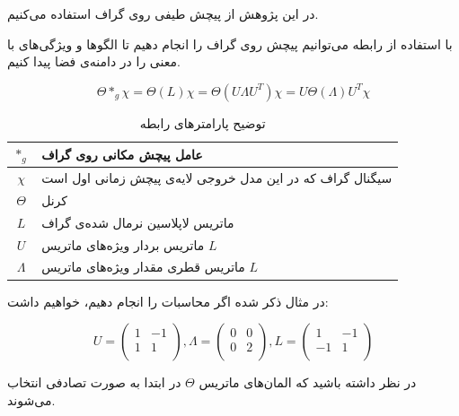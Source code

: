 در این پژوهش از پیچش طیفی روی گراف‌ استفاده می‌کنیم. 

با استفاده از رابطه  می‌توانیم پیچش روی گراف را انجام دهیم تا الگوها و ویژگی‌های با معنی را در دامنه‌ی فضا پیدا کنیم.

\begin{equation}
  \Theta *_{g} \chi = \Theta(L)\chi = \Theta(U \Lambda U^{T})\chi = U\Theta(\Lambda)U^{T}\chi
  \label{eq:convolution}
\end{equation}

\begin{table}[h]
  \centering
  \caption{توضیح پارامترهای رابطه }
  \begin{tabular}{|c|p{}|}
    \hline
    $*_{g}$ & عامل پیچش مکانی روی گراف \\
    \hline
    $\chi$ & سیگنال گراف که در این مدل خروجی لایه‌ی پیچش زمانی اول است \\
    \hline
    $\Theta$ & کرنل \\
    \hline
    $L$ & ماتریس لاپلاسین نرمال شده‌ی گراف \\
    \hline
    $U$ & ماتریس بردار ویژه‌های ماتریس $L$ \\
    \hline
    $\Lambda$ & ماتریس قطری مقدار ویژه‌های ماتریس $L$ \\
    \hline
  \end{tabular}
  \label{tbl:distance}
\end{table}

در مثال ذکر شده اگر محاسبات را انجام دهیم، خواهیم داشت:

\[
U = \left(
  \begin{array}{cc}
  1 & -1 \\
  1 & 1 \\
  \end{array}
\right),
\Lambda = \left(
  \begin{array}{cc}
  0 & 0 \\
  0 & 2 \\
  \end{array}
\right),
L = \left(
  \begin{array}{cc}
  1 & -1 \\
  -1 & 1 \\
  \end{array}
\right)
\]

در نظر داشته باشید که المان‌های ماتریس $\Theta$ در ابتدا به صورت تصادفی انتخاب می‌شوند.


